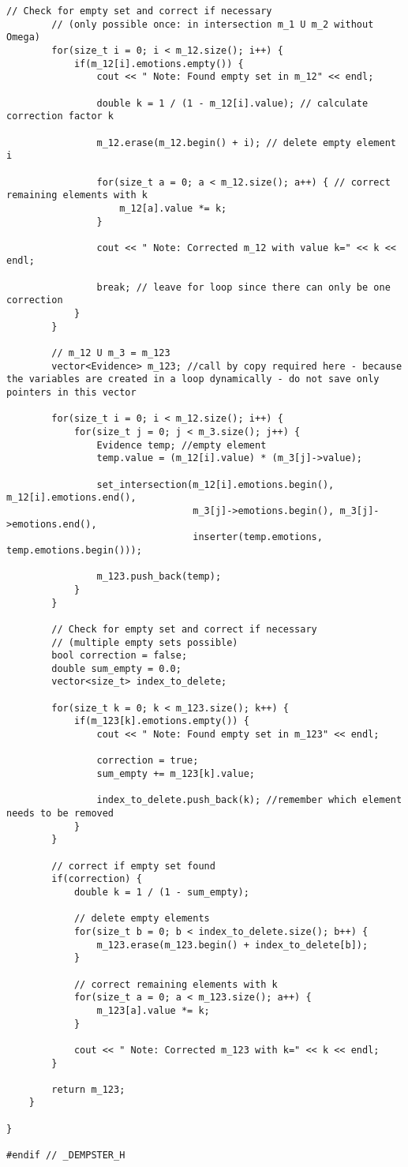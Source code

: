 \begin{lstlisting}[caption=Code dempster.h]
		// Check for empty set and correct if necessary
		// (only possible once: in intersection m_1 U m_2 without Omega)
		for(size_t i = 0; i < m_12.size(); i++) {
			if(m_12[i].emotions.empty()) {
				cout << " Note: Found empty set in m_12" << endl;

				double k = 1 / (1 - m_12[i].value); // calculate correction factor k

				m_12.erase(m_12.begin() + i); // delete empty element i

				for(size_t a = 0; a < m_12.size(); a++) { // correct remaining elements with k
					m_12[a].value *= k;
				}

				cout << " Note: Corrected m_12 with value k=" << k << endl;

				break; // leave for loop since there can only be one correction
			}
		}

		// m_12 U m_3 = m_123
		vector<Evidence> m_123; //call by copy required here - because the variables are created in a loop dynamically - do not save only pointers in this vector

		for(size_t i = 0; i < m_12.size(); i++) {
			for(size_t j = 0; j < m_3.size(); j++) {
				Evidence temp; //empty element
				temp.value = (m_12[i].value) * (m_3[j]->value);

				set_intersection(m_12[i].emotions.begin(), m_12[i].emotions.end(),
								 m_3[j]->emotions.begin(), m_3[j]->emotions.end(),
								 inserter(temp.emotions, temp.emotions.begin()));

				m_123.push_back(temp);
			}
		}

		// Check for empty set and correct if necessary
		// (multiple empty sets possible)
		bool correction = false;
		double sum_empty = 0.0;
		vector<size_t> index_to_delete;

		for(size_t k = 0; k < m_123.size(); k++) {
			if(m_123[k].emotions.empty()) {
				cout << " Note: Found empty set in m_123" << endl;

				correction = true;
				sum_empty += m_123[k].value;

				index_to_delete.push_back(k); //remember which element needs to be removed
			}
		}

		// correct if empty set found
		if(correction) {
			double k = 1 / (1 - sum_empty);

			// delete empty elements
			for(size_t b = 0; b < index_to_delete.size(); b++) {
				m_123.erase(m_123.begin() + index_to_delete[b]);
			}

			// correct remaining elements with k
			for(size_t a = 0; a < m_123.size(); a++) {
				m_123[a].value *= k;
			}

			cout << " Note: Corrected m_123 with k=" << k << endl;
		}

		return m_123;
	}

}

#endif // _DEMPSTER_H
\end{lstlisting}


